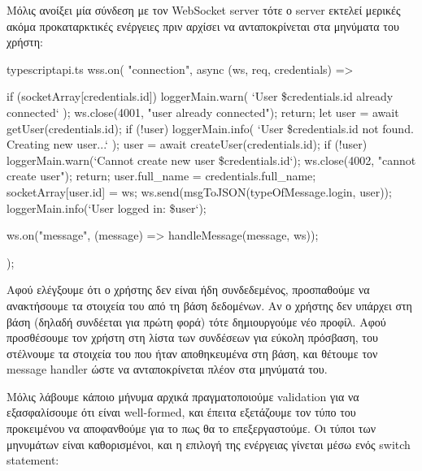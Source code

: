 \documentclass[../thesis.tex]{subfiles}
\begin{document}
\bigskip

Μόλις ανοίξει μία σύνδεση με τον WebSocket server τότε ο server εκτελεί μερικές ακόμα προκαταρκτικές ενέργειες πριν αρχίσει να ανταποκρίνεται στα μηνύματα του χρήστη:

\begin{codeblock}{typescript}{api.ts}
  wss.on(
    "connection",
    async (ws, req, credentials) => {
      if (socketArray[credentials.id]) {
        loggerMain.warn(
          `User \${credentials.id} already connected`
        );
        ws.close(4001, "user already connected");
        return;
      }
      let user = await getUser(credentials.id);
      if (!user) {
        loggerMain.info(
          `User \${credentials.id} not found. Creating new user...`
        );
        user = await createUser(credentials.id);
        if (!user) {
          loggerMain.warn(`Cannot create new user \${credentials.id}`);
          ws.close(4002, "cannot create user");
          return;
        }
      }
      user.full_name = credentials.full_name;
      socketArray[user.id] = ws;
      ws.send(msgToJSON(typeOfMessage.login, user));
      loggerMain.info(`User logged in: \${user}`);

      ws.on("message", (message) => handleMessage(message, ws));
    }
  );
\end{codeblock}

Αφού ελέγξουμε ότι ο χρήστης δεν είναι ήδη συνδεδεμένος, προσπαθούμε να ανακτήσουμε τα στοιχεία του από τη βάση δεδομένων.
Αν ο χρήστης δεν υπάρχει στη βάση (δηλαδή συνδέεται για πρώτη φορά) τότε δημιουργούμε νέο προφίλ.
Αφού προσθέσουμε τον χρήστη στη λίστα των συνδέσεων για εύκολη πρόσβαση, του στέλνουμε τα στοιχεία του που ήταν αποθηκευμένα στη βάση, και θέτουμε τον message handler ώστε να ανταποκρίνεται πλέον στα μηνύματά του.

\bigskip

Μόλις λάβουμε κάποιο μήνυμα αρχικά πραγματοποιούμε validation για να εξασφαλίσουμε ότι είναι well-formed, και έπειτα εξετάζουμε τον τύπο του προκειμένου να αποφανθούμε για το πως θα το επεξεργαστούμε.
Οι τύποι των μηνυμάτων είναι καθορισμένοι, και η επιλογή της ενέργειας γίνεται μέσω ενός switch statement:
\end{document}
